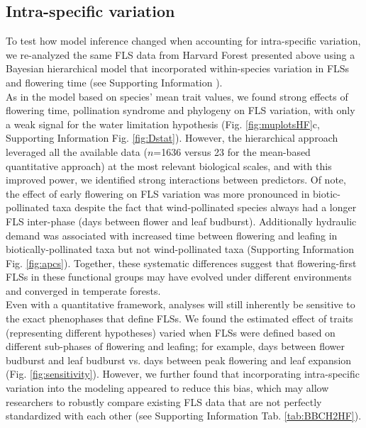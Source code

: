 \documentclass[11pt]{article}
\begin{document}
\subsection*{Intra-specific variation}
\noindent To test how model inference changed when accounting for intra-specific variation, we re-analyzed the same FLS data from Harvard Forest presented above using a Bayesian hierarchical model that incorporated within-species variation in FLSs and flowering time (see Supporting Information ).\\

\noindent As in the model based on species' mean trait values, we found strong effects of flowering time, pollination syndrome and phylogeny on FLS variation, with only a weak signal for the water limitation  hypothesis (Fig. \ref{fig:muplotsHF}c, Supporting Information Fig. \ref{fig:Dstat}). However, the hierarchical approach leveraged all the available data ($n$=1636 versus 23 for the mean-based quantitative approach) at the most relevant biological scales, and with this improved power, we identified strong interactions between predictors. Of note, the effect of early flowering on FLS variation was more pronounced in biotic-pollinated taxa despite the fact that wind-pollinated species always had a longer FLS inter-phase (days between flower and leaf budburst). Additionally hydraulic demand  was associated with increased time between flowering and leafing in biotically-pollinated taxa but not wind-pollinated taxa (Supporting Information Fig. \ref{fig:apcs}). Together, these systematic differences suggest that flowering-first FLSs in these functional groups may have evolved under different environments and converged in temperate forests.\\%

\noindent Even with a quantitative framework, analyses will still inherently be sensitive to the exact phenophases that define FLSs. We found the estimated effect of traits (representing different hypotheses) varied when FLSs were defined based on different sub-phases of flowering and leafing; for example, days between flower budburst and leaf budburst vs. days between peak flowering and leaf expansion (Fig. \ref{fig:sensitivity}). However, we further found that incorporating intra-specific variation into the modeling appeared to reduce this bias, which may allow researchers to robustly compare existing FLS data  that are not perfectly standardized with each other (see Supporting Information Tab. \ref{tab:BBCH2HF}).\\
\end{document}
